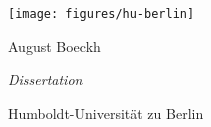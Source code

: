 
\begin{titlepage}
\hfill\texttt{[image: figures/hu-berlin]}


\vfill
\begin{center}
\Large
August Boeckh\par
\textit{Dissertation}
\end{center}
\vfill
Humboldt-Universität zu Berlin
\end{titlepage}